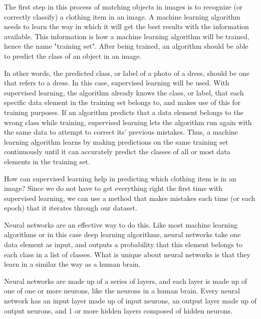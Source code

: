 \documentclass[12pt]{article} %
\begin{document}
	The first step in this process of matching objects in images is to recognize (or correctly classify) a clothing item in an image. A machine learning algorithm needs to learn the way in which it will get the best results with the information available. This information is how a machine learning algorithm will be trained, hence the name "training set". After being trained, an algorithm should be able to predict the class of an object in an image. 

In other words, the predicted class, or label of a photo of a dress, should be one that refers to a dress. In this case, supervised learning will be used. With supervised learning, the algorithm already knows the class, or label, that each specific data element in the training set belongs to, and makes use of this for training purposes. If an algorithm predicts that a data element belongs to the wrong class while training, supervised learning lets the algorithm run again with the same data to attempt to correct its' previous mistakes\cite{aurelienMachineLearning}. Thus, a machine learning algorithm learns by making predictions on the same training set continuously until it can accurately predict the classes of all or most data elements in the training set. 
	
	How can supervised learning help in predicting which clothing item is in an image? Since we do not have to get everything right the first time with supervised learning, we can use a method that makes mistakes each time (or each epoch) that it iterates through our dataset. 

Neural networks are an effective way to do this. Like most machine learning algorithms or in this case deep learning algorithms, neural networks take one data element as input, and outputs a probability that this element belongs to each class in a list of classes. What is unique about neural networks is that they learn in a similar the way as a human brain. 

Neural networks are made up of a series of layers, and each layer is made up of one of one or more neurons, like the neurons in a human brain. Every neural network has an input layer made up of input neurons, an output layer made up of output neurons, and 1 or more hidden layers composed of hidden neurons. 
\end{document}
